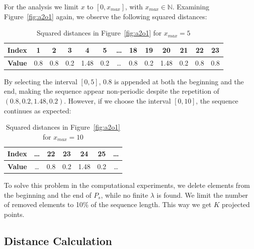 \documentclass[11pt]{article}
\theoremstyle{remark}
\begin{document}
%
For the analysis we limit $x$ to $[0, x_{max}]$, with $x_{max} \in \mathbb{N}$.
%
Examining Figure~\ref{fig:a2o1} again, we observe the following squared distances:
%
\begin{table}[htbp]
\centering
\begin{tabular}{| c | c || c | c | c | c | c | c | c | c | c | c || c |}
    \hline
    \textbf{Index} &   1 &   2 &   3 &    4 &   5 & \dots &  18 &  19 &   20 &  21 &  22 &  23 \\ \hline
    \textbf{Value} & 0.8 & 0.8 & 0.2 & 1.48 & 0.2 & \dots & 0.8 & 0.2 & 1.48 & 0.2 & 0.8 & 0.8 \\ \hline
\end{tabular}
\caption{Squared distances in Figure~\ref{fig:a2o1} for $x_{max} = 5$}
\label{tab:distances1}
\end{table}

By selecting the interval $[0, 5]$, $0.8$ is appended at both the beginning and the end, making the sequence appear non-periodic despite the repetition of $(0.8, 0.2, 1.48, 0.2)$. However, if we choose the interval $[0, 10]$, the sequence continues as expected:
%
\begin{table}[htbp]
\centering
  \begin{tabular}{| c | c | c | c | c | c | c |}
    \hline
    \textbf{Index} & \dots &  22 &  23 &   24 &  25 & \dots \\ \hline
    \textbf{Value} & \dots & 0.8 & 0.2 & 1.48 & 0.2 & \dots \\ \hline
  \end{tabular}
\caption{Squared distances in Figure~\ref{fig:a2o1} for $x_{max} = 10$}
\label{tab:distances2}
\end{table}

To solve this problem in the computational experiments, we delete elements from the beginning and the end of $P_s$, while no finite $\lambda$ is found. We limit the number of removed elements to 10\% of the sequence length.
%
This way we get $K$ projected points.

\subsection{Distance Calculation}
\end{document}
